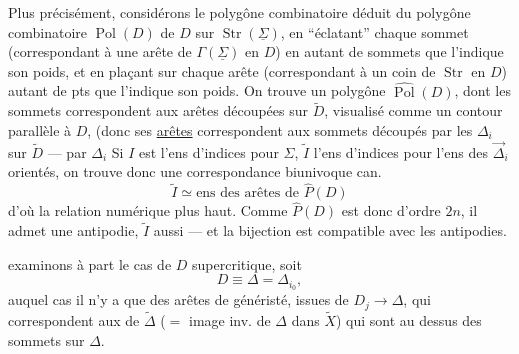 
Plus précisément, considérons le polygône combinatoire déduit du polygône combinatoire $\operatorname{Pol}(D)$ de $D$ sur $\operatorname{Str}(\underline\Sigma)$, en ``éclatant'' chaque sommet (correspondant à une arête de $\Gamma(\underline\Sigma)$ en $D$) en autant de sommets que l'indique son poids, et en plaçant sur chaque arête (correspondant à un coin de $\operatorname{Str}$ en $D$) autant de pts que l'indique son poids. On trouve un polygône $\widehat{\operatorname{Pol}}(D)$,  dont les sommets correspondent aux arêtes découpées sur  $\widetilde D$, visualisé comme un contour parallèle à $D$,  (donc ses \uline{arêtes} correspondent aux sommets découpés par les $\Delta_i$ sur $\widetilde D$ ---  par $\Delta_i$  Si $I$ est l'ens d'indices pour $\Sigma$, $\widetilde I$ l'ens d'indices pour l'ens des $\vec\Delta_i$ orientés, on trouve donc une correspondance biunivoque can.
\[
\widetilde I\simeq\text{ens des arêtes de }\widehat P(D)
\]
d'où la relation  numérique plus haut.  Comme $\widehat P(D)$ est donc d'ordre $2n$, il admet une antipodie, $\widetilde I$ aussi --- et la bijection est compatible avec les antipodies.


  examinons à part le cas de $D$ supercritique, soit 
\[
D\equiv\Delta=\Delta_{i_0},
\]
auquel cas il n'y a  que des arêtes de généristé, issues de $D_j\to\Delta$, qui correspondent aux   de $\widetilde\Delta$ ($={}$ image inv. de $\Delta$ dans $\widetilde X$) qui sont au dessus des sommets sur $\Delta$.


